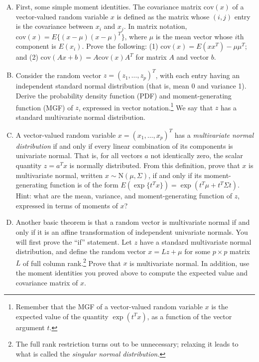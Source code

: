 \documentclass{mynotes}
\newcommand{\N}{\mbox{N}}
\begin{document}
\begin{enumerate}[(A)]

\item First, some simple moment identities.  The covariance matrix $\mbox{cov}(x)$ of a vector-valued random variable $x$ is defined as the matrix whose $(i,j)$ entry is the covariance between $x_i$ and $x_j$.  In matrix notation, $\mbox{cov}(x) = E\{ (x - \mu) (x - \mu)^T \}$, where $\mu$ is the mean vector whose $i$th component is $E(x_i)$.  Prove the following: (1) $\mbox{cov}(x) = E(xx^T) - \mu \mu^T$; and (2) $\mbox{cov}(Ax + b) = A \mbox{cov}(x) A^T$ for matrix $A$ and vector $b$.

\item Consider the random vector $z = (z_1, \ldots, z_p)^T$, with each entry having an independent standard normal distribution (that is, mean 0 and variance 1).  Derive the probability density function (PDF) and moment-generating function (MGF) of $z$, expressed in vector notation.\footnote{Remember that the MGF of a vector-valued random variable $x$ is the expected value of the quantity $\exp(t^T x)$, as a function of the vector argument $t$.}   We say that $z$ has a standard multivariate normal distribution.

\item A vector-valued random variable $x = (x_1, \ldots, x_p)^T$ has a \textit{multivariate normal distribution} if and only if every linear combination of its components is univariate normal.  That is, for all vectors $a$ not identically zero, the scalar quantity $z = a^T x$ is normally distributed.  From this definition, prove that $x$ is multivariate normal, written $x \sim \N(\mu, \Sigma)$, if and only if its moment-generating function is of the form $E(\exp \{t^T x\}) = \exp(t^T \mu + t^T \Sigma t)$.  Hint: what are the mean, variance, and moment-generating function of $z$, expressed in terms of moments of $x$?

\item Another basic theorem is that a random vector is multivariate normal if and only if it is an affine transformation of independent univariate normals.  You will first prove the ``if'' statement.  Let $z$ have a standard multivariate normal distribution, and define the random vector $x = L z + \mu$ for some $p \times p$ matrix $L$ of full column rank.\footnote{The full rank restriction turns out to be unnecessary; relaxing it leads to what is called the \textit{singular normal distribution.}}   Prove that $x$ is multivariate normal.  In addition, use the moment identities you proved above to compute the expected value and covariance matrix of $x$.  


\end{enumerate}
\end{document}
